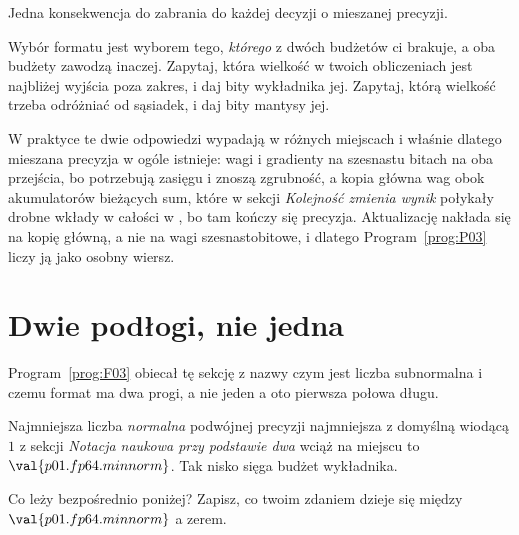 \begin{fr}

Jedna konsekwencja do zabrania do każdej decyzji o mieszanej precyzji.

Wybór formatu jest wyborem tego, \emph{którego} z dwóch budżetów ci brakuje, a
oba budżety zawodzą inaczej. Zapytaj, która wielkość w twoich obliczeniach jest
najbliżej wyjścia poza zakres, i daj bity wykładnika jej. Zapytaj, którą
wielkość trzeba odróżniać od sąsiadek, i daj bity mantysy jej.

W praktyce te dwie odpowiedzi wypadają w różnych miejscach i właśnie dlatego
mieszana precyzja w ogóle istnieje: wagi i gradienty na szesnastu bitach na
oba przejścia, bo potrzebują zasięgu i znoszą zgrubność, a kopia główna wag
obok akumulatorów \dash{} bieżących sum, które w sekcji \emph{Kolejność zmienia
wynik} połykały drobne wkłady w całości \dash{} w , bo tam kończy
się precyzja. Aktualizację nakłada się na kopię główną, a nie na wagi
szesnastobitowe, i dlatego Program~\ref{prog:P03} liczy ją jako osobny
wiersz.
\end{fr}

\section{Dwie podłogi, nie jedna}
\label{sec:P01-floors}

\begin{fr}
Program~\ref{prog:F03} obiecał tę sekcję z nazwy \dash{} czym jest liczba
subnormalna i czemu format ma dwa progi, a nie jeden \dash{} a oto pierwsza
połowa długu.

Najmniejsza liczba \emph{normalna} podwójnej precyzji \dash{} najmniejsza z
domyślną wiodącą $1$ z sekcji \emph{Notacja naukowa przy podstawie dwa} wciąż
na miejscu \dash{} to $\val{p01.fp64.minnorm}$. Tak nisko sięga budżet
wykładnika.

Co leży bezpośrednio poniżej? Zapisz, co twoim zdaniem dzieje się między
$\val{p01.fp64.minnorm}$ a zerem.
\nextframe
\end{fr}

